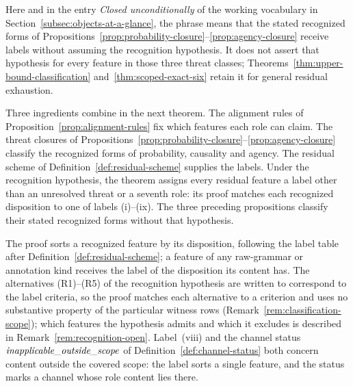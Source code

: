 Here and in the entry \emph{Closed unconditionally} of the working vocabulary in Section~\ref{subsec:objects-at-a-glance}, the phrase means that the stated recognized forms of Propositions~\ref{prop:probability-closure}--\ref{prop:agency-closure} receive labels without assuming the recognition hypothesis. It does not assert that hypothesis for every feature in those three threat classes; Theorems~\ref{thm:upper-bound-classification} and~\ref{thm:scoped-exact-six} retain it for general residual exhaustion.

Three ingredients combine in the next theorem. The alignment rules of
Proposition~\ref{prop:alignment-rules} fix which features each role can
claim. The threat closures of
Propositions~\ref{prop:probability-closure}--\ref{prop:agency-closure}
classify the recognized forms of probability, causality and agency. The residual scheme of
Definition~\ref{def:residual-scheme} supplies the labels. Under the
recognition hypothesis, the theorem assigns every residual feature a
label other than an unresolved threat or a seventh role: its proof
matches each recognized disposition to one of labels (i)--(ix). The
three preceding propositions classify their stated recognized forms
without that hypothesis.

The proof sorts a recognized feature by its disposition, following the
label table after Definition~\ref{def:residual-scheme}; a feature of any
raw-grammar or annotation kind receives the label of the disposition its
content has. The alternatives (R1)--(R5) of the recognition hypothesis are
written to correspond to the label criteria, so the proof matches each
alternative to a criterion and uses no substantive property of the particular
witness rows (Remark~\ref{rem:classification-scope}); which features the
hypothesis admits and which it excludes is described in
Remark~\ref{rem:recognition-open}.
Label~(viii) and the channel status \(\textit{inapplicable\_\allowbreak outside\_\allowbreak scope}\) of
Definition~\ref{def:channel-status} both concern content outside the
covered scope: the label sorts a single feature, and the status marks a
channel whose role content lies there.

